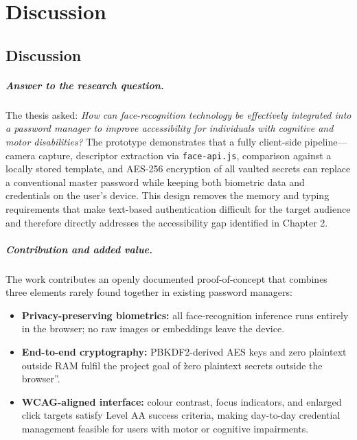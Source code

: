 
\chapter{Discussion}%
\label{ch:conclusie}


\section{Discussion}

\paragraph{Answer to the research question.}
The thesis asked: \emph{How can face-recognition technology be effectively integrated into a password manager to improve accessibility for individuals with cognitive and motor disabilities?}
The prototype demonstrates that a fully client-side pipeline—camera capture, descriptor extraction via \texttt{face-api.js}, comparison against a locally stored template, and AES-256 encryption of all vaulted secrets can replace a conventional master password while keeping both biometric data and credentials on the user’s device.
This design removes the memory and typing requirements that make text-based authentication difficult for the target audience and therefore directly addresses the accessibility gap identified in Chapter 2.

\paragraph{Contribution and added value.}
The work contributes an openly documented proof-of-concept that combines three elements rarely found together in existing password managers:

\begin{itemize}
\item \textbf{Privacy-preserving biometrics:} all face-recognition inference runs entirely in the browser; no raw images or embeddings leave the device.
\item \textbf{End-to-end cryptography:} PBKDF2-derived AES keys and zero plaintext outside RAM fulfil the project goal of \`\`zero plaintext secrets outside the browser''.
\item \textbf{WCAG-aligned interface:} colour contrast, focus indicators, and enlarged click targets satisfy Level AA success criteria, making day-to-day credential management feasible for users with motor or cognitive impairments.
\end{itemize}


